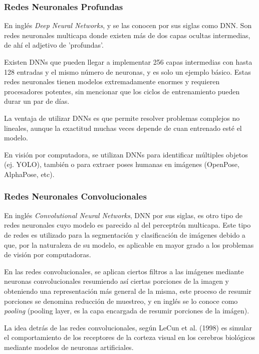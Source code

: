 \documentclass[a4paper,12pt,oneside,spanish]{book}
\begin{document}
\subsubsection{Redes Neuronales Profundas}
En inglés \textit{Deep Neural Networks}, y se las conocen por sus siglas como DNN. Son redes neuronales multicapa donde existen más de dos capas ocultas intermedias, de ahí el adjetivo de 'profundas'.\par

Existen DNNs que pueden llegar a implementar 256 capas intermedias con hasta 128 entradas y el mismo número de neuronas, y es solo un ejemplo básico. Estas redes neuronales tienen modelos extremadamente enormes y requieren procesadores potentes, sin mencionar que los ciclos de entrenamiento pueden durar un par de días.\par

La ventaja de utilizar DNNs es que permite resolver problemas complejos no lineales, aunque la exactitud muchas veces depende de cuan entrenado esté el modelo.\par

En visión por computadora, se utilizan DNNs para identificar múltiples objetos (ej. YOLO), también o para extraer poses humanas en imágenes (OpenPose, AlphaPose, etc).\par

\subsubsection{Redes Neuronales Convolucionales}
En inglés \textit{Convolutional Neural Networks}, DNN por sus siglas, es otro tipo de redes neuronales cuyo modelo es parecido al del perceptrón multicapa. Este tipo de redes es utilizado para la segmentación y clasificación de imágenes debido a que, por la naturaleza de su modelo, es aplicable en mayor grado a los problemas de visión por computadoras.\par

En las redes convolucionales, se aplican ciertos filtros a las imágenes mediante neuronas convolucionales resumiendo así ciertas porciones de la imagen y obteniendo una representación más general de la misma, este proceso de resumir porciones se denomina reducción de muestreo, y en inglés se lo conoce como \textit{pooling} (pooling layer, es la capa encargada de resumir porciones de la imágen). \par

La idea detrás de las redes convolucionales, según LeCun et al. (1998) \cite{convolutional1} es simular el comportamiento de los receptores de la corteza visual en los cerebros biológicos mediante modelos de neuronas artificiales. \par
\end{document}
